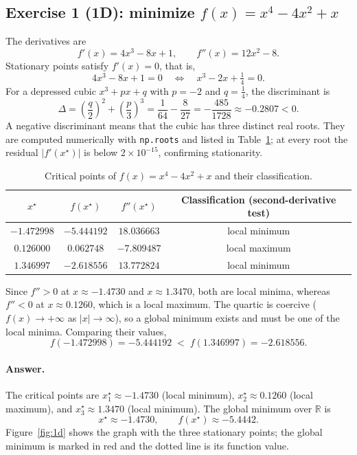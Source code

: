 \documentclass[11pt,a4paper]{article}
\newcommand{\R}{\mathbb{R}}
\begin{document}
\subsection{Exercise 1 (1D): minimize \texorpdfstring{$f(x)=x^4-4x^2+x$}{f(x) = x4 - 4x2 + x}}

The derivatives are
\begin{equation}
f'(x)=4x^3-8x+1,
\qquad
f''(x)=12x^2-8 .
\label{eq:d1}
\end{equation}
Stationary points satisfy $f'(x)=0$, that is,
\begin{equation}
4x^3-8x+1=0
\quad\Longleftrightarrow\quad
x^3-2x+\tfrac14=0 .
\label{eq:cubic}
\end{equation}
For a depressed cubic $x^3+px+q$ with $p=-2$ and $q=\tfrac14$, the discriminant is
\begin{equation}
\Delta=\left(\frac{q}{2}\right)^2+\left(\frac{p}{3}\right)^3
=\frac{1}{64}-\frac{8}{27}
=-\frac{485}{1728}\approx -0.2807<0 .
\label{eq:disc}
\end{equation}
A negative discriminant means that the cubic has three distinct real roots. They are computed
numerically with \texttt{np.roots} and listed in Table~\ref{tab:1d}; at every root the residual
$|f'(x^\star)|$ is below $2\times10^{-15}$, confirming stationarity.

\begin{table}[H]
\centering
\small
\begin{tabular}{cccc}
\toprule
$x^\star$ & $f(x^\star)$ & $f''(x^\star)$ & Classification (second-derivative test)\\
\midrule
$-1.472998$ & $-5.444192$ & $18.036663$ & local minimum\\
$0.126000$  & $0.062748$  & $-7.809487$ & local maximum\\
$1.346997$  & $-2.618556$ & $13.772824$ & local minimum\\
\bottomrule
\end{tabular}
\caption{Critical points of $f(x)=x^4-4x^2+x$ and their classification.}
\label{tab:1d}
\end{table}

Since $f''>0$ at $x\approx-1.4730$ and $x\approx1.3470$, both are local minima, whereas
$f''<0$ at $x\approx0.1260$, which is a local maximum. The quartic is coercive
($f(x)\to+\infty$ as $|x|\to\infty$), so a global minimum exists and must be one of the local
minima. Comparing their values,
\[
f(-1.472998)=-5.444192 \;<\; f(1.346997)=-2.618556 .
\]

\paragraph{Answer.}
The critical points are $x_1^\star\approx-1.4730$ (local minimum),
$x_2^\star\approx0.1260$ (local maximum), and $x_3^\star\approx1.3470$ (local minimum). The
global minimum over $\R$ is
\[
x^\star\approx-1.4730,
\qquad f(x^\star)\approx-5.4442 .
\]
Figure~\ref{fig:1d} shows the graph with the three stationary points; the global minimum is
marked in red and the dotted line is its function value.
\end{document}
